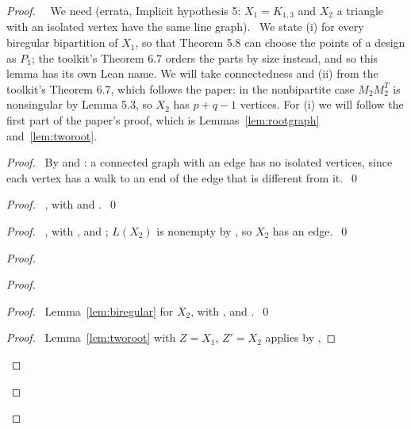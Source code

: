 \begin{proof}
 \pfsketch\ \repair\ We need  (errata, Implicit hypothesis 5: $X_1=K_{1,3}$ and $X_2$ a
 triangle with an isolated vertex have the same line graph). \new\ We state (i) for every
 biregular bipartition of $X_1$, so that Theorem 5.8 can choose the points of a design as $P_1$;
 the toolkit's Theorem 6.7 orders the parts by size instead, and so this lemma has its own Lean
 name. We will take connectedness and (ii) from the toolkit's Theorem 6.7, which follows the
 paper: in the nonbipartite case $M_2M_2^T$ is nonsingular by Lemma 5.3, so $X_2$ has $p+q-1$
 vertices. For (i) we will follow the first part of the paper's proof, which is
 Lemmas~\ref{lem:rootgraph} and~\ref{lem:tworoot}.
 \begin{proof}\pf\ By  and : a connected graph with an edge has no
  isolated vertices, since each vertex has a walk to an end of the edge that is different from
  it.~\qed\end{proof}
 \begin{proof}\pf\ , with  and .~\qed\end{proof}
 \begin{proof}\pf\ , with ,  and ; $L(X_2)$ is
  nonempty by , so $X_2$ has an edge.~\qed\end{proof}
 \begin{proof}
  \begin{proof}
   \begin{proof}\pf\ Lemma~\ref{lem:biregular} for $X_2$, with , 
    and .~\qed\end{proof}
   \qedstep
   \begin{proof}\pf\ Lemma~\ref{lem:tworoot} with $Z=X_1$, $Z'=X_2$ applies by ,

\end{proof}
\end{proof}
\end{proof}
\end{proof}
